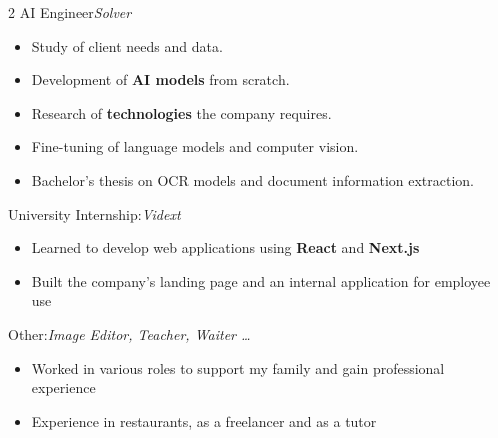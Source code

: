 \documentclass{miquelcv}
\begin{document}
\begin{paracol}{2}
%
  {AI Engineer}{\textit{Solver}}%
  {\begin{itemize}[nosep, left=0pt]
    \item Study of client needs and data.
    \item Development of \textbf{AI models} from scratch.
    \item Research of \textbf{technologies} the company requires.
    \item Fine-tuning of language models and computer vision.
    \item Bachelor's thesis on OCR models and document information extraction.
   \end{itemize}
   }

%
  {University Internship:}{\textit{Vidext}}%
  {\begin{itemize}[nosep, left=0pt]
    \item Learned to develop web applications using \textbf{React} and \textbf{Next.js}
    \item Built the company's landing page and an internal application for employee use
   \end{itemize}
   }



%
  {Other:}{\textit{Image Editor, Teacher, Waiter \ldots}}%
  {\begin{itemize}[nosep, left=0pt]
    \item Worked in various roles to support my family and gain professional experience
    \item Experience in restaurants, as a freelancer and as a tutor
   \end{itemize}}

\drawtimelinelines

\newtimeline


\end{paracol}
\end{document}
